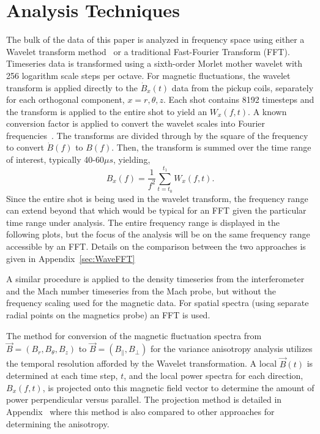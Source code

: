 \documentclass[aip,prl,amsmath,amssymb,reprint,superscriptaddress]{revtex4-1} %
\begin{document}
\section{Analysis Techniques}\label{sec:analysis}

The bulk of the data of this paper is analyzed in frequency space using either a Wavelet transform method~\cite{torrence98} or a traditional Fast-Fourier Transform (FFT). Timeseries data is transformed using a sixth-order Morlet mother wavelet with 256 logarithm scale steps per octave. For magnetic fluctuations, the wavelet transform is applied directly to the $\dot{B}_{x}(t)$ data from the pickup coils, separately for each orthogonal component, $x = r,\theta,z$. Each shot contains 8192 timesteps and the transform is applied to the entire shot to yield an $W_{x}(f,t)$. A known conversion factor is applied to convert the wavelet scales into Fourier frequencies~\cite{torrence98}. The transforms are divided through by the square of the frequency to convert $\dot{B}(f)$ to $B(f)$. Then, the transform is summed over the time range of interest, typically 40-60$\mu s$, yielding,
\begin{equation}
B_{x}(f) = \frac{1}{f^{2}}\sum_{t=t_{0}}^{t_{1}} W_{x}(f,t).
\label{eq:wavelet_transform}
\end{equation}
%
Since the entire shot is being used in the wavelet transform, the frequency range can extend beyond that which would be typical for an FFT given the particular time range under analysis. The entire frequency range is displayed in the following plots, but the focus of the analysis will be on the same frequency range accessible by an FFT. Details on the comparison between the two approaches is given in Appendix~\ref{sec:WaveFFT}

A similar procedure is applied to the density timeseries from the interferometer and the Mach number timeseries from the Mach probe, but without the frequency scaling used for the magnetic data. For spatial spectra (using separate radial points on the magnetics probe) an FFT is used.

The method for conversion of the magnetic fluctuation spectra from $\vec{B} = (B_{r},B_{\theta},B_{z})$ to $\vec{B} = (B_{\parallel},B_{\perp})$ for the variance anisotropy analysis utilizes the temporal resolution afforded by the Wavelet transformation. A local $\vec{B}(t)$ is determined at each time step, $t$, and the local power spectra for each direction, $B_{x}(f,t)$, is projected onto this magnetic field vector to determine the amount of power perpendicular versus parallel. The projection method is detailed in Appendix~\cite{sec:projection} where this method is also compared to other approaches for determining the anisotropy.
\end{document}
